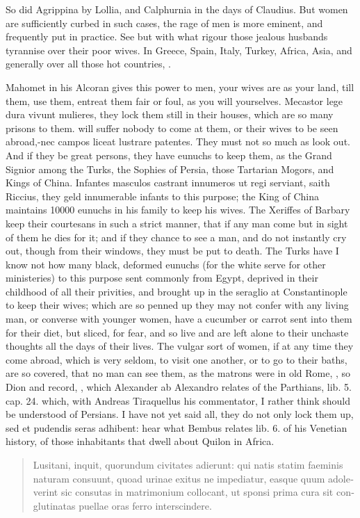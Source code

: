 So did Agrippina by Lollia, and Calphurnia in the days of Claudius. But
women are sufficiently curbed in such cases, the rage of men is more
eminent, and frequently put in practice. See but with what rigour those
jealous husbands tyrannise over their poor wives. In Greece, Spain,
Italy, Turkey, Africa, Asia, and generally over all those hot
countries, .

Mahomet in his Alcoran gives this power to men, your wives are as your
land, till them, use them, entreat them fair or foul, as you will
yourselves. Mecastor lege dura vivunt mulieres, they lock them
still in their houses, which are so many prisons to them. will suffer
nobody to come at them, or their wives to be seen abroad,-nec campos
liceat lustrare patentes. They must not so much as look out. And if
they be great persons, they have eunuchs to keep them, as the Grand
Signior among the Turks, the Sophies of Persia, those Tartarian Mogors,
and Kings of China. Infantes masculos castrant innumeros ut regi
serviant, saith Riccius, they geld innumerable infants to this
purpose; the King of China maintains 10\thinspace{}000 eunuchs in his family
to keep his wives. The Xeriffes of Barbary keep their courtesans in
such a strict manner, that if any man come but in sight of them he dies
for it; and if they chance to see a man, and do not instantly cry out,
though from their windows, they must be put to death. The Turks have I
know not how many black, deformed eunuchs (for the white serve for
other ministeries) to this purpose sent commonly from Egypt, deprived
in their childhood of all their privities, and brought up in the
seraglio at Constantinople to keep their wives; which are so penned up
they may not confer with any living man, or converse with younger
women, have a cucumber or carrot sent into them for their diet, but
sliced, for fear, \etc{} and so live and are left alone to their unchaste
thoughts all the days of their lives. The vulgar sort of women, if at
any time they come abroad, which is very seldom, to visit one another,
or to go to their baths, are so covered, that no man can see them, as
the matrons were in old Rome, , so
Dion and \Seneca record, , which
Alexander ab Alexandro relates of the Parthians, lib. 5. cap. 24.
which, with Andreas Tiraquellus his commentator, I rather think should
be understood of Persians. I have not yet said all, they do not only
lock them up, sed et pudendis seras adhibent: hear what Bembus relates
lib. 6. of his Venetian history, of those inhabitants that dwell about
Quilon in Africa.
%
\begin{latin}
\begin{quote}%
Lusitani, inquit, quorundum civitates adierunt: qui
natis statim faeminis naturam consuunt, quoad urinae exitus ne
impediatur, easque quum adoleverint sic consutas in matrimonium
collocant, ut sponsi prima cura sit conglutinatas puellae oras ferro
interscindere.
\end{quote}%
\end{latin}

